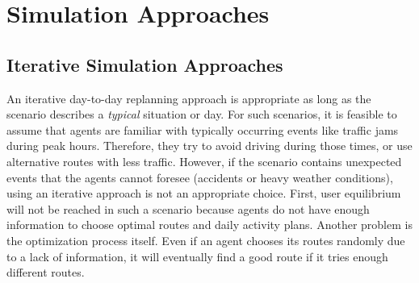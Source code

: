 \section{Simulation Approaches} 
\label{sec:SimulationApproaches}
\subsection{Iterative Simulation Approaches} 
\label{sec:IterativeSimulationApproaches}

An iterative day-to-day replanning approach is appropriate as long as the scenario describes a \emph{typical} situation or day. For such scenarios, it is feasible to assume that agents are familiar with typically occurring events like traffic jams during peak hours. Therefore, they try to avoid driving during those times, or use alternative routes with less traffic. However, if the scenario contains unexpected events that the agents cannot foresee (\eg accidents or heavy weather conditions), using an iterative approach is not an appropriate choice. First, user equilibrium will not be reached in such a scenario because agents do not have enough information to choose optimal routes and daily activity plans. Another problem is the optimization process itself. Even if an agent chooses its routes randomly due to a lack of information, it will eventually find a good route if it tries enough different routes.


